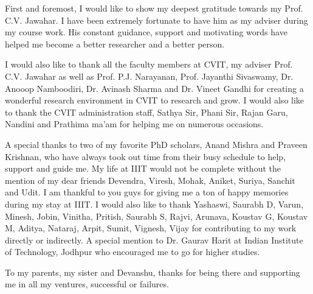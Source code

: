 First and foremost, I would like to show my deepest gratitude towards my  Prof. C.V. Jawahar. I have been extremely fortunate to have him as my adviser during my course work. His constant guidance, support and motivating words have helped me become a better researcher and a better person.

I would also like to thank all the faculty members at \textsc{CVIT}, my adviser Prof. C.V. Jawahar as well as Prof. P.J. Narayanan, Prof. Jayanthi Sivaswamy, Dr. Anooop Namboodiri, Dr. Avinash Sharma and Dr. Vineet Gandhi for creating a wonderful research environment in \textsc{CVIT} to research and grow. I would also like to thank the \textsc{CVIT} administration staff, Sathya Sir, Phani Sir, Rajan Garu, Nandini and Prathima ma'am for helping me on numerous occasions.

A special thanks to two of my favorite PhD scholars, Anand Mishra and Praveen Krishnan, who have always took out time from their busy schedule to help, support and guide me. My life at \textsc{IIIT} would not be complete without the mention of my dear friends Devendra, Viresh, Mohak, Aniket, Suriya, Sanchit and Udit. I am thankful to you guys for giving me a ton of happy memories during my stay at IIIT. I would also like to thank Yashaswi, Saurabh D, Varun, Minesh, Jobin, Vinitha, Pritish, Saurabh S, Rajvi, Arunava, Koustav G, Koustav M, Aditya, Nataraj, Arpit, Sumit, Vignesh, Vijay for contributing to my work directly or indirectly. A special mention to Dr. Gaurav Harit at Indian Institute of Technology, Jodhpur who encouraged me to go for higher studies.

To my parents, my sister and Devanshu, thanks for being there and supporting me in all my ventures, successful or failures.